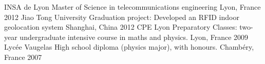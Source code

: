 \begin{cvhonors}
  \cvhonor
    {INSA de Lyon}
    {Master of Science in telecommunications engineering}
    {Lyon, France}
    {2012}
  \cvhonor
    {Jiao Tong University}
    {Graduation project: Developed an RFID indoor geolocation system}
    {Shanghai, China}
    {2012}
  \cvhonor
    {CPE Lyon}
    {Preparatory Classes: two-year undergraduate intensive course in maths and physics.}
    {Lyon, France}
    {2009}
\cvhonor
    {Lycée Vaugelas}
    {High school diploma (physics major), with honours.}    
    {Chambéry, France}
    {2007}
\end{cvhonors}
